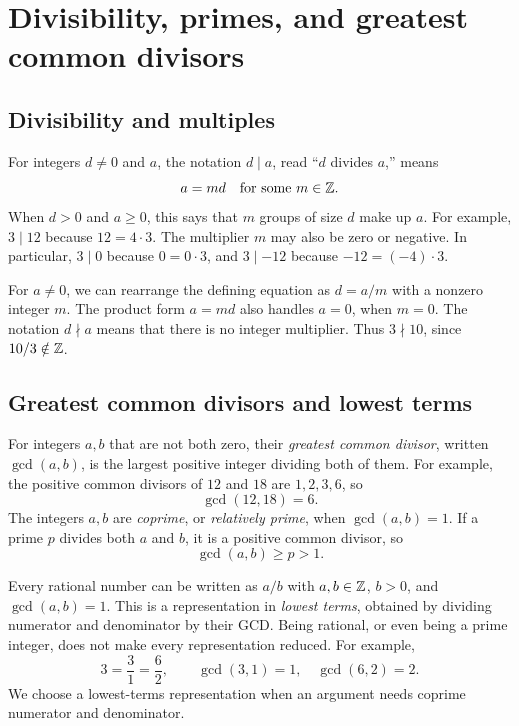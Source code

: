 
\section{Divisibility, primes, and greatest common divisors}
\label{sec:appendix:divisibility}

\subsection{Divisibility and multiples}
For integers $d\ne0$ and $a$, the notation $d\mid a$, read
``$d$ divides $a$,'' means
\[
  a=md\quad\text{for some }m\in\mathbb{Z}.
\]
When $d>0$ and $a\ge0$, this says that $m$ groups of size $d$ make up
$a$. For example, $3\mid12$ because $12=4\cdot3$.
The multiplier $m$ may also be zero or negative. In particular,
$3\mid0$ because $0=0\cdot3$, and $3\mid-12$ because
$-12=(-4)\cdot3$.

For $a\ne0$, we can rearrange the defining equation as $d=a/m$ with
a nonzero integer $m$. The product form $a=md$ also handles $a=0$,
when $m=0$. The notation $d\nmid a$ means that there is no integer
multiplier. Thus $3\nmid10$, since $10/3\notin\mathbb{Z}$.

\subsection{Greatest common divisors and lowest terms}
For integers $a,b$ that are not both zero, their \emph{greatest common
divisor}, written $\gcd(a,b)$, is the largest positive integer dividing
both of them. For example, the positive common divisors of $12$ and
$18$ are $1,2,3,6$, so
\[
  \gcd(12,18)=6.
\]
The integers $a,b$ are \emph{coprime}, or \emph{relatively prime},
when $\gcd(a,b)=1$. If a prime $p$ divides both $a$ and $b$, it is a
positive common divisor, so
\[
  \gcd(a,b)\ge p>1.
\]

Every rational number can be written as $a/b$ with $a,b\in\mathbb{Z}$,
$b>0$, and $\gcd(a,b)=1$. This is a representation in \emph{lowest
terms}, obtained by dividing numerator and denominator by their GCD.
Being rational, or even being a prime integer, does not make every
representation reduced. For example,
\[
  3=\frac31=\frac62,\qquad
  \gcd(3,1)=1,\quad\gcd(6,2)=2.
\]
We choose a lowest-terms representation when an argument needs
coprime numerator and denominator.

